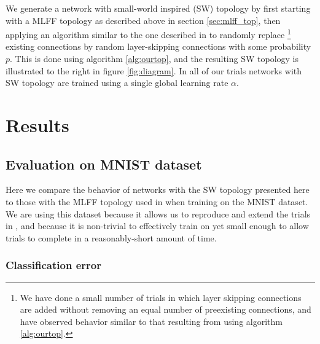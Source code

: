 \documentclass[utf8]{frontiersSCNS}
\begin{document}
We generate a network with small-world inspired (SW) topology by first starting with a MLFF topology as described above in section \ref{sec:mlff_top}, then applying an algorithm similar to the one described in \citep{watts98} to randomly replace
\footnote{We have done a small number of trials in which layer skipping connections are added without removing an equal number of preexisting connections, and have observed behavior similar to that resulting from using algorithm \ref{alg:ourtop}.} existing connections by random layer-skipping connections with some probability $p$. This is done using algorithm \ref{alg:ourtop}, and the resulting SW topology is illustrated to the right in figure \ref{fig:diagram}. In all of our trials networks with SW topology are trained using a single global learning rate $\alpha$.

\section{Results}

\subsection{Evaluation on MNIST dataset}
\label{sec:origpaper}

Here we compare the behavior of networks with the SW topology presented here to those with the MLFF topology used in \citep{scellier17} when training on the MNIST dataset. We are using this dataset because it allows us to reproduce and extend the trials in \citep{scellier17}, and because it is non-trivial to effectively train on yet small enough to allow trials to complete in a reasonably-short amount of time.

\subsubsection{Classification error}\label{sec:network_performance}
\end{document}
